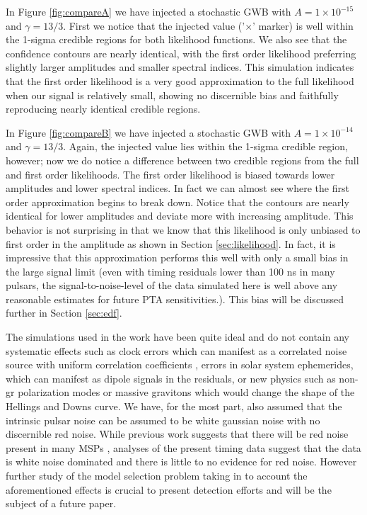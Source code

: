 \documentclass[iop]{emulateapj} \usepackage{apjfonts}
\begin{document}
 In Figure \ref{fig:compareA} we have injected a stochastic GWB with
$A=1\times 10^{-15}$ and $\gamma=13/3$. First we notice that the
injected value ('$\times$' marker) is well within the 1-sigma credible
regions for both likelihood functions. We also see that the confidence
contours are nearly identical, with the first order likelihood
preferring slightly larger amplitudes and smaller spectral indices.
This simulation indicates that the first order likelihood is a very
good approximation to the full likelihood when our signal is
relatively small, showing no discernible bias and faithfully
reproducing nearly identical credible regions.
 
 In Figure \ref{fig:compareB} we have injected a stochastic GWB with
$A=1\times 10^{-14}$ and $\gamma=13/3$. Again, the injected value lies
within the 1-sigma credible region, however; now we do notice a
difference between two credible regions from the full and first order
likelihoods. The first order likelihood is biased towards lower
amplitudes and lower spectral indices. In fact we can almost see where
the first order approximation begins to break down. Notice that the
contours are nearly identical for lower amplitudes and deviate more
with increasing amplitude. This behavior is not surprising in that we
know that this likelihood is only unbiased to first order in the
amplitude as shown in Section \ref{sec:likelihood}. In fact, it is
impressive that this approximation performs this well with only a
small bias in the large signal limit (even with timing residuals lower
than 100 ns in many pulsars, the signal-to-noise-level of the data
simulated here is well above any reasonable estimates for future PTA
sensitivities.). This bias will be discussed further in Section
\ref{sec:edf}.
 
 The simulations used in the work have been quite ideal and do not
contain any systematic effects such as clock errors which can manifest
as a correlated noise source with uniform correlation coefficients
\citep{ych+11}, errors in solar system ephemerides, which can manifest as dipole signals in the residuals, or
new physics such as non-gr polarization modes \citep{ljp08,ss12} or
massive gravitons \citep{ljp+10} which would change the shape of the
Hellings and Downs curve. We have, for the most part, also assumed
that the intrinsic pulsar noise can be assumed to be white gaussian
noise with no discernible red noise. While previous work suggests that
there will be red noise present in many MSPs \citep{sc10}, analyses of
the present timing data \citep{vhj+11,delphine,esd+13} suggest that
the data is white noise dominated and there is little to no evidence
for red noise. However further study of the model selection problem
taking in to account the aforementioned effects is crucial to present
detection efforts and will be the subject of a future paper.
 
\end{document}
